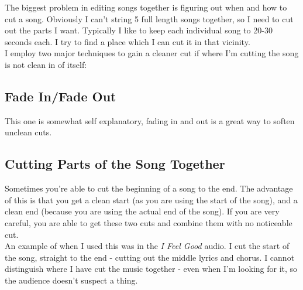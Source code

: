             The biggest problem in editing songs together is figuring out when and how to cut a song. Obviously I can't string 5 full length songs together, so I need to cut out the parts I want. Typically I like to keep each individual song to 20-30 seconds each. I try to find a place which I can cut it in that vicinity.\\
            
            I employ two major techniques to gain a cleaner cut if where I'm cutting the song is not clean in of itself:\\
            
            \subsection{Fade In/Fade Out}
            	This one is somewhat self explanatory, fading in and out is a great way to soften unclean cuts.\\
                
			\subsection{Cutting Parts of the Song Together}
            	Sometimes you're able to cut the beginning of a song to the end. The advantage of this is that you get a clean start (as you are using the start of the song), and a clean end (because you are using the actual end of the song). If you are very careful, you are able to get these two cuts and combine them with no noticeable cut.\\
                
                An example of when I used this was in the \textit{I Feel Good} audio. I cut the start of the song, straight to the end - cutting out the middle lyrics and chorus. I cannot distinguish where I have cut the music together - even when I'm looking for it, so the audience doesn't suspect a thing.\\      
                
		                
                
            
            
            
